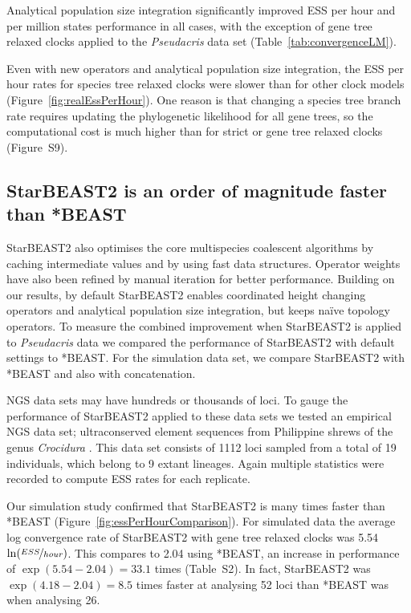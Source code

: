 \documentclass[nogrid]{MBE}%
\begin{document}
Analytical population size integration significantly improved ESS per hour and
per million states performance in all cases, with the exception of gene tree
relaxed clocks applied to the \textit{Pseudacris} data set
(Table~\ref{tab:convergenceLM}).

Even with new operators and analytical population size integration, the ESS
per hour rates for species tree relaxed clocks were slower than for other
clock models (Figure~\ref{fig:realEssPerHour}). One reason is that changing a
species tree branch rate requires updating the phylogenetic likelihood for all
gene trees, so the computational cost is much higher than for strict or gene
tree relaxed clocks (Figure~S9).

\subsection{StarBEAST2 is an order of magnitude faster than *BEAST}

StarBEAST2 also optimises the core multispecies coalescent algorithms by
caching intermediate values and by using fast data structures. Operator
weights have also been refined by manual iteration for better performance.
Building on our results, by default StarBEAST2 enables coordinated height
changing operators and analytical population size integration, but keeps
na\"ive topology operators. To measure the combined improvement when
StarBEAST2 is applied to \textit{Pseudacris} data we compared the performance
of StarBEAST2 with default settings to *BEAST. For the simulation data set, we
compare StarBEAST2 with *BEAST and also with concatenation.

NGS data sets may have hundreds or thousands of loci. To gauge the performance
of StarBEAST2 applied to these data sets we tested an empirical NGS data set;
ultraconserved element \citep[UCE;][]{Faircloth01102012} sequences from
Philippine shrews of the genus \textit{Crocidura} \citep{Giarla01092015}. This
data set consists of 1112 loci sampled from a total of 19 individuals, which
belong to 9 extant lineages. Again multiple statistics were recorded to
compute ESS rates for each replicate.

Our simulation study confirmed that StarBEAST2 is many times faster than
*BEAST (Figure~\ref{fig:essPerHourComparison}). For simulated data the average
log convergence rate of StarBEAST2 with gene tree relaxed clocks was 5.54
$\ln(\nicefrac{ESS}{hour})$. This compares to 2.04 using *BEAST, an
increase in performance of $\exp(5.54 - 2.04) = 33.1$ times (Table~S2). In
fact, StarBEAST2 was
$\exp(4.18 - 2.04) = 8.5$ times faster at analysing 52 loci than *BEAST
was when analysing 26.
\end{document}
